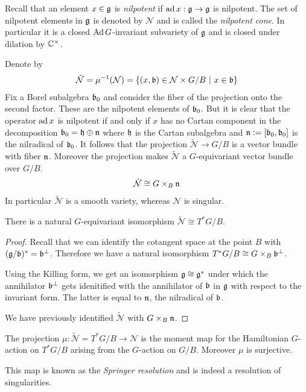 \documentclass[12pt]{article}
\begin{document}
Recall that an element $x\in \mathfrak{g}$ is \emph{nilpotent} if $\operatorname{ad} x: \mathfrak{g} \to \mathfrak{g}$ is nilpotent. The set of nilpotent elements in $\mathfrak{g}$ is denoted by $\mathcal{N}$ and is called the \emph{nilpotent cone}. In particular it is a closed $\operatorname{Ad} G$-invariant subvariety of $\mathfrak{g}$ and is closed under dilation by $\mathbb{C}^\times$.

Denote by \begin{align*}
     \tilde{\mathcal{N}} = \mu^{-1}(\mathcal{N}) = \{(x,\mathfrak{b}) \in \mathcal{N} \times G/B \ \vert \  x\in \mathfrak{b}\}
\end{align*} Fix a Borel subalgebra $\mathfrak{b}_0$ and consider the fiber of the projection onto the second factor. These are the nilpotent elements of $\mathfrak{b}_0$. But it is clear that the operator $\operatorname{ad} x$ is nilpotent if and only if $x$ has no Cartan component in the decomposition $\mathfrak{b}_0 = \mathfrak{h} \oplus \mathfrak{n}$ where $\mathfrak{h}$ is the Cartan subalgebra and $\mathfrak{n} := [\mathfrak{b}_0,\mathfrak{b}_0]$ is the nilradical of $\mathfrak{b}_0$. It follows that the projection $\tilde{\mathcal{N}} \to G/B$ is a vector bundle with fiber $\mathfrak{n}$. Moreover the projection makes $\tilde{\mathcal{N}}$ a $G$-equivariant vector bundle over $G/B$. \begin{align*}
    \tilde{\mathcal{N}} \cong G \times_B \mathfrak{n}
\end{align*} In particular $\tilde{\mathcal{N}}$ is a smooth variety, whereas $\mathcal{N}$ is singular.

\begin{claim}
    There is a natural $G$-equivariant isomorphism $\tilde{\mathcal{N}} \cong T^*G/B$. 
\end{claim}

\begin{proof}
Recall that we can identify the cotangent space at the point $B$ with $(\mathfrak{g}/\mathfrak{b})^* = \mathfrak{b}^\perp$. Therefore we have a natural isomorphism $T^*G/B \cong G\times_B \mathfrak{b}^\perp$.

Using the Killing form, we get an isomorphism $\mathfrak{g} \cong \mathfrak{g}^*$ under which the annihilator $\mathfrak{b}^\perp$ gets idenitified with the annihilator of $\mathfrak{b}$ in $\mathfrak{g}$ with respect to the invariant form. The latter is equal to $\mathfrak{n}$, the nilradical of $\mathfrak{b}$. 

We have previously identified $\tilde{\mathcal{N}}$ with $G\times_B \mathfrak{n}$. 
\end{proof}

\begin{proposition}
    The projection $\mu: \tilde{\mathcal{N}} = T^*G/B \to \mathcal{N}$ is the moment map for the Hamiltonian $G$-action on $T^*G/B$ arising from the $G$-action on $G/B$. Moreover $\mu$ is surjective.
\end{proposition}
This map is known as the \emph{Springer resolution} and is indeed a resolution of singularities.
\end{document}
